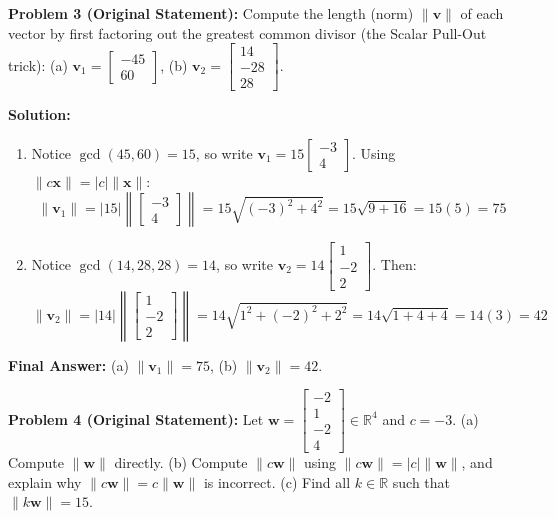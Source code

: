 \documentclass[11pt, letterpaper]{article}
\theoremstyle{definition}
\theoremstyle{remark}
\begin{document}
\medskip
\textbf{Problem 3 (Original Statement):} Compute the length (norm) $\|\mathbf{v}\|$ of each vector by first factoring out the greatest common divisor (the Scalar Pull-Out trick): (a) $\mathbf{v}_1 = \begin{bmatrix} -45 \\ 60 \end{bmatrix}$, (b) $\mathbf{v}_2 = \begin{bmatrix} 14 \\ -28 \\ 28 \end{bmatrix}$.

\textbf{Solution:}
\begin{enumerate}[label=(\alph*)]
    \item Notice $\gcd(45, 60) = 15$, so write $\mathbf{v}_1 = 15\begin{bmatrix} -3 \\ 4 \end{bmatrix}$. Using $\|c\mathbf{x}\| = |c|\|\mathbf{x}\|$:
    \[
    \|\mathbf{v}_1\| = |15| \left\| \begin{bmatrix} -3 \\ 4 \end{bmatrix} \right\| = 15\sqrt{(-3)^2 + 4^2} = 15\sqrt{9 + 16} = 15(5) = 75
    \]
    \item Notice $\gcd(14, 28, 28) = 14$, so write $\mathbf{v}_2 = 14\begin{bmatrix} 1 \\ -2 \\ 2 \end{bmatrix}$. Then:
    \[
    \|\mathbf{v}_2\| = |14| \left\| \begin{bmatrix} 1 \\ -2 \\ 2 \end{bmatrix} \right\| = 14\sqrt{1^2 + (-2)^2 + 2^2} = 14\sqrt{1 + 4 + 4} = 14(3) = 42
    \]
\end{enumerate}
\textbf{Final Answer:} (a) $\|\mathbf{v}_1\| = 75$, (b) $\|\mathbf{v}_2\| = 42$.

\medskip
\textbf{Problem 4 (Original Statement):} Let $\mathbf{w} = \begin{bmatrix} -2 \\ 1 \\ -2 \\ 4 \end{bmatrix} \in \mathbb{R}^4$ and $c = -3$. (a) Compute $\|\mathbf{w}\|$ directly. (b) Compute $\|c\mathbf{w}\|$ using $\|c\mathbf{w}\| = |c|\|\mathbf{w}\|$, and explain why $\|c\mathbf{w}\| = c\|\mathbf{w}\|$ is incorrect. (c) Find all $k \in \mathbb{R}$ such that $\|k\mathbf{w}\| = 15$.
\end{document}
